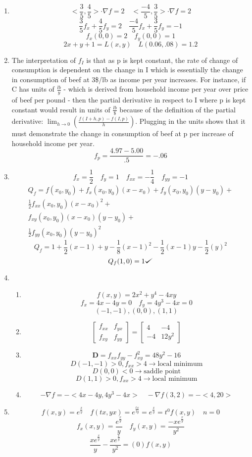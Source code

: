 \documentclass[12pt]{article}
\def\checkmark{\tikz\fill[scale=0.4](0,.35) -- (.25,0) -- (1,.7) -- (.25,.15) -- cycle;}
\begin{document}
\begin{enumerate}
\item $$<\frac{3}{5}, \frac{4}{5}> \cdot \nabla f = 2 \quad <\frac{-4}{5}, \frac{3}{5}> \cdot \nabla f = 2$$
$$\frac{3}{5}f_x+\frac{4}{5}f_y=2 \quad \frac{-4}{5}f_x+\frac{3}{5}f_y=-1$$
$$f_x (0,0) = 2 \quad f_y(0,0)=1$$
$$2x+y+1=L(x,y) \quad L(0.06, .08) = 1.2$$
\item The interpretation of $f_I$ is that as p is kept constant, the rate of change of consumption is dependent on the change in I which is essentially the change in consumption of beef at 3\$/lb as income per year increases. For instance, if C has units of $\frac{lb}{y}$ - which is derived from household income per year over price of beef per pound - then the partial derivative in respect to I where p is kept constant would result in units of $\frac{lb}{\$}$ because of the definition of the partial derivative: $\lim_{h\rightarrow0}(\frac{f(I+h,p) - f(I,p)}{h})$. Plugging in the units shows that it must demonstrate the change in consumption of beef at p per increase of household income per year.
$$f_p = \frac{4.97-5.00}{.5} = -.06$$
\item 
$$f_x = \frac{1}{2} \quad f_y = 1 \quad f_{xx} = -\frac{1}{4} \quad f_{yy}=-1$$
\begin{align*}
Q_f=f(x_0,y_0)+f_x(x_0,y_0)(x-x_0)+f_y(x_0,y_0)(y-y_0)+ \\
\frac{1}{2}f_{xx}(x_0,y_0)(x-x_0)^2+ \\
f_{xy}(x_0,y_0)(x-x_0)(y-y_0)+ \\
\frac{1}{2}f_{yy}(x_0,y_0)(y-y_0)^2
\end{align*}
$$Q_f = 1+\frac{1}{2}(x-1)+y-\frac{1}{8}(x-1)^2-\frac{1}{2}(x-1)y-\frac{1}{2}(y)^2$$
$$Q_f(1,0) = 1 \checkmark$$
\item \begin{enumerate}
\item $$f(x,y) = 2x^2+y^4-4xy$$
$$f_x = 4x-4y = 0 \quad f_y = 4y^3-4x=0$$
$$(-1,-1), (0,0), (1,1)$$
\item 
$$
\begin{bmatrix}
   f_{xx} & f_{yx} \\
   f_{xy} & f_{yy}
\end{bmatrix}
=
\begin{bmatrix}
   4 & -4 \\
   -4 & 12y^2
\end{bmatrix}$$
\item $$\textbf{D} = f_{xx}f_{yy} - f_{xy}^2 = 48y^2-16$$
$$D(-1,-1) > 0, f_{xx} > 4 \rightarrow \textrm{local minimum}$$
$$D(0,0) < 0 \rightarrow \textrm{saddle point}$$
$$D(1,1) > 0, f_{xx} > 4 \rightarrow \textrm{local minimum}$$
\item $$-\nabla f = -<4x-4y, 4y^3-4x> \quad -\nabla f(3,2) = -<4, 20>$$
\end{enumerate}
\item $$f(x,y)=e^{\frac{x}{y}} \quad f(tx,yx) = e^{\frac{tx}{ty}} = e^{\frac{x}{y}} = t^0f(x,y) \quad n = 0$$
$$f_x(x,y) = \frac{e^{\frac{x}{y}}}{y} \quad f_y(x,y)=\frac{-xe^{\frac{x}{y}}}{y^2}$$
$$\frac{xe^{\frac{x}{y}}}{y} - \frac{xe^{\frac{x}{y}}}{y^2} = (0)f(x,y)$$
\end{enumerate} 
\end{document}
